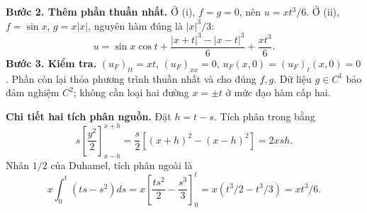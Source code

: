 \documentclass[10pt,a4paper]{article}
\begin{document}
\textbf{Bước 2. Thêm phần thuần nhất.} Ở (i), $f=g=0$, nên $u=xt^3/6$. Ở (ii), $f=\sin x$, $g=x|x|$, nguyên hàm đúng là $|x|^3/3$:
\[u=\sin x\cos t+\frac{|x+t|^3-|x-t|^3}{6}+\frac{xt^3}{6}.\]
\textbf{Bước 3. Kiểm tra.} $(u_F)_{tt}=xt$, $(u_F)_{xx}=0$, $u_F(x,0)=(u_F)_t(x,0)=0$. Phần còn lại thỏa phương trình thuần nhất và cho đúng $f,g$. Dữ liệu $g\in C^1$ bảo đảm nghiệm $C^2$; không cần loại hai đường $x=\pm t$ ở mức đạo hàm cấp hai.

\textbf{Chi tiết hai tích phân nguồn.} Đặt $h=t-s$. Tích phân trong bằng
\[s\left[\frac{y^2}{2}\right]_{x-h}^{x+h}
=\frac s2[(x+h)^2-(x-h)^2]=2xsh.\]
Nhân $1/2$ của Duhamel, tích phân ngoài là
\[x\int_0^t(ts-s^2)ds=x\left[\frac{ts^2}{2}-\frac{s^3}{3}\right]_0^t
=x(t^3/2-t^3/3)=xt^3/6.\]
\end{document}
